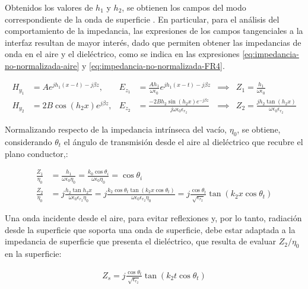 Obtenidos los valores de $h_1$ y $h_2$, se obtienen los campos del modo correspondiente de la onda de superficie \cite{Pozar:MwEngineering}. En particular, para el análisis del comportamiento de la impedancia, las expresiones de los campos tangenciales a la interfaz resultan de mayor interés, dado que permiten obtener las impedancias de onda en el aire y el dieléctrico, como se indica en las expresiones \ref{eq:impedancia-no-normalizada-aire} y \ref{eq:impedancia-no-normalizada-FR4}.

\begin{subequations}
	\begin{align}
		H_{y_1} &= A e^{jh_1(x-t)-j\beta z}, &E_{z_1} &= \frac{A h_1}{\omega \epsilon_0} e^{jh_1(x-t)-j\beta z} &\implies& Z_1 = \frac{h_1}{\omega \epsilon_0} \label{eq:impedancia-no-normalizada-aire}\\
		H_{y_2} &= 2 B \cos(h_2 x) e^{j\beta z}, &E_{z_2} &=  \frac{-2 B h_2 \sin(h_2 x)e^{-j\beta z}}{j \omega \epsilon_0 \epsilon_{r_2}} &\implies& Z_2 = \frac{jh_2 \tan(h_2 x)}{\omega \epsilon_0 \epsilon_{r_2}} \label{eq:impedancia-no-normalizada-FR4}
	\end{align}
\end{subequations}

Normalizando respecto de la impedancia intrínseca del vacío, $\eta_0$, se obtiene, considerando $\theta_t$ el ángulo de transmisión desde el aire al dieléctrico que recubre el plano conductor,:

\begin{align}
	\frac{Z_{1}}{\eta_0} &= \frac{h_1}{\omega \epsilon_0 \eta_0} = \frac{k_0 \cos\theta_i}{\omega \epsilon_0 \eta_0} = \cos \theta_i \\
	\frac{Z_{2}}{\eta_0} &= j\frac{h_2 \tan h_2 x}{\omega \epsilon_0 \epsilon_{r_2} \eta_0} = j\frac{k_2 \cos\theta_t \tan(k_2 x \cos\theta_t)}{\omega \epsilon_0 \epsilon_{r_2} \eta_0} = j \frac{\cos \theta_t}{\sqrt{\epsilon_{r_2}}}\tan(k_2 x \cos\theta_t)
\end{align}

Una onda incidente desde el aire, para evitar reflexiones y, por lo tanto, radiación desde la superficie que soporta una onda de superficie, debe estar adaptada a la impedancia de superficie que presenta el dieléctrico, que resulta de evaluar $Z_2/\eta_0$ en la superficie:

\begin{align}
	Z_s = j \frac{\cos \theta_t}{\sqrt{\epsilon_{r_2}}}\tan(k_2 t \cos\theta_t)
\end{align}

